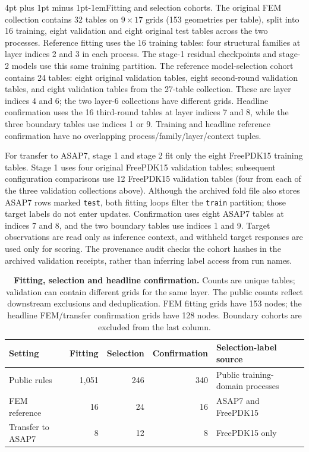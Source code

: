 \documentclass{article}
\makeatletter
\renewcommand{\paragraph}{\@startsection{paragraph}{4}{\z@}
  {4pt plus 1pt minus 1pt}{-1em}{\normalsize\bf}}
\makeatother
\begin{document}
\paragraph{Fitting and selection cohorts.}
The original FEM collection contains 32 tables on $9\times17$ grids
(153 geometries per table), split into 16 training, eight validation and eight
original test tables across the two processes. Reference fitting uses the
16 training tables: four structural families at layer indices 2 and 3 in each
process. The stage-1 residual checkpoints and stage-2 models use this same
training partition. The reference model-selection cohort contains 24 tables:
eight original validation tables, eight second-round validation tables, and
eight validation tables from the 27-table collection. These are layer indices
4 and 6; the two layer-6 collections have different grids. Headline confirmation
uses the 16 third-round tables at layer indices 7 and 8, while the three
boundary tables use indices 1 or 9. Training and headline reference confirmation
have no overlapping process/family/layer/context tuples.

For transfer to ASAP7, stage 1 and stage 2 fit only the eight FreePDK15
training tables. Stage 1 uses four original FreePDK15 validation tables;
subsequent configuration comparisons use 12 FreePDK15 validation tables
(four from each of the three validation collections above). Although the
archived fold file also stores ASAP7 rows marked \texttt{test}, both fitting
loops filter the \texttt{train} partition; those target labels do not enter
updates. Confirmation uses eight ASAP7 tables at indices 7 and 8, and the
two boundary tables use indices 1 and 9. Target observations are read only as
inference context, and withheld target responses are used only for scoring.
The provenance audit checks the cohort hashes in the archived validation
receipts, rather than inferring label access from run names.

\begin{table}[htbp]
\centering\small
\caption{\textbf{Fitting, selection and headline confirmation.} Counts are
unique tables; validation can contain different grids for the same layer.
The public counts reflect downstream exclusions and deduplication.
FEM fitting grids have 153 nodes; the headline FEM/transfer confirmation grids
have 128 nodes. Boundary cohorts are excluded from the last column.}
\label{tab:fit-selection-audit}
\begin{tabular*}{\linewidth}{@{\extracolsep{\fill}}lrrrl@{}}
\toprule
Setting & Fitting & Selection & Confirmation & Selection-label source \\
\midrule
Public rules & 1,051 & 246 & 340 & Public training-domain processes \\
FEM reference & 16 & 24 & 16 & ASAP7 and FreePDK15 \\
Transfer to ASAP7 & 8 & 12 & 8 & FreePDK15 only \\
\bottomrule
\end{tabular*}
\end{table}
\end{document}
